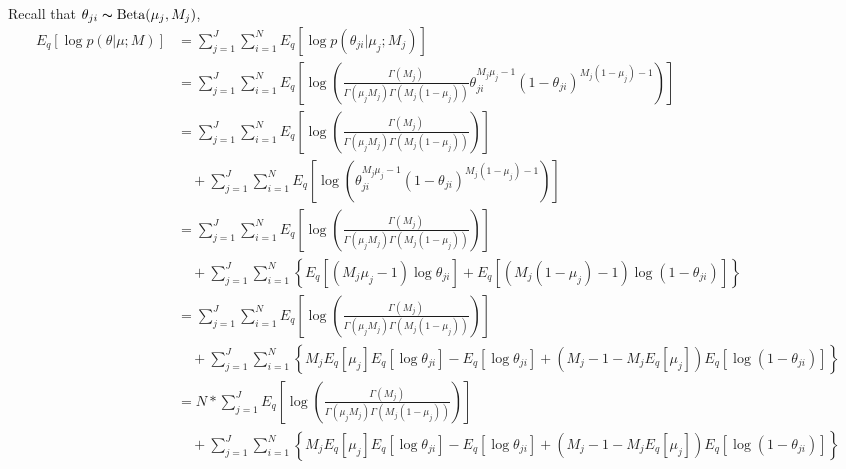 \documentclass[11pt,reqno]{amsart}
\begin{document}
Recall that $\theta_{ji} \thicksim \text{Beta}(\mu_j, M_j)$,
\begin{equation}
\begin{split}
\label{theta}
E_q \left[ \log p\left(\theta | \mu; M \right)\right] &= \sum_{j=1}^{J} \sum_{i=1}^{N} E_q \left[ \log p\left(\theta_{ji} | \mu_j; M_j \right)\right] \\
&= \sum_{j=1}^{J} \sum_{i=1}^{N}  E_q  \left[ \log \left( \frac{ \Gamma(M_j) } { \Gamma(\mu_j M_j) \Gamma(M_j (1-\mu_j)) } \theta_{ji}^{M_j\mu_j -1} (1 - \theta_{ji})^{M_j ( 1 - \mu_j) - 1} \right) \right] \\
%
&= \sum_{j=1}^{J} \sum_{i=1}^{N} E_q  \left[ \log \left( \frac{ \Gamma(M_j) } { \Gamma(\mu_j M_j) \Gamma(M_j (1-\mu_j)) }\right) \right] \\
&\quad + \sum_{j=1}^{J} \sum_{i=1}^{N}  E_q  \left[ \log \left( \theta_{ji}^{M_j\mu_j -1} (1 - \theta_{ji})^{M_j ( 1 - \mu_j) - 1} \right) \right] \\
%
&= \sum_{j=1}^{J} \sum_{i=1}^{N} E_q  \left[ \log \left( \frac{ \Gamma(M_j) } { \Gamma(\mu_j M_j) \Gamma(M_j (1-\mu_j)) }\right) \right]  \\
&\quad + \sum_{j=1}^{J} \sum_{i=1}^{N} \left\lbrace E_q \left[ \left( M_j\mu_j -1 \right) \log \theta_{ji} \right] + E_q \left[ \left( M_j ( 1 - \mu_j) - 1 \right) \log \left( 1 - \theta_{ji} \right) \right]\right\rbrace \\
%
&= \sum_{j=1}^{J} \sum_{i=1}^{N} E_q  \left[ \log \left( \frac{ \Gamma(M_j) } { \Gamma(\mu_j M_j) \Gamma(M_j (1-\mu_j)) }\right) \right] \\
&\quad + \sum_{j=1}^{J} \sum_{i=1}^{N} \left\lbrace M_j E_q \left[ \mu_j \right] E_q \left[ \log \theta_{ji} \right] - E_q  \left[ \log \theta_{ji} \right] + \left( M_j - 1 - M_j E_q\left[ \mu_j \right]  \right) E_q\left[ \log \left( 1 - \theta_{ji}\right) \right] \right\rbrace \\
&= N* \sum_{j=1}^{J} E_q  \left[ \log \left( \frac{ \Gamma(M_j) } { \Gamma(\mu_j M_j) \Gamma(M_j (1-\mu_j)) }\right) \right] \\
&\quad + \sum_{j=1}^{J} \sum_{i=1}^{N} \left\lbrace M_j E_q \left[ \mu_j \right] E_q \left[ \log \theta_{ji} \right] - E_q  \left[ \log \theta_{ji} \right] + \left( M_j - 1 - M_j E_q\left[ \mu_j \right]  \right) E_q\left[ \log \left( 1 - \theta_{ji}\right) \right] \right\rbrace \\
%

\end{split}
\end{equation}
\end{document}
